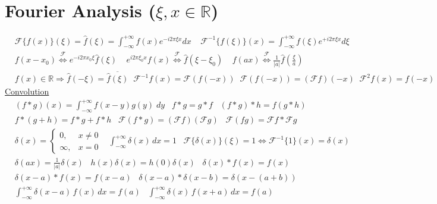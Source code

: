 \section*{\normalsize Fourier Analysis{\normalfont\scriptsize \; ($\xi, x\in \mathbb{R}$)}}
\begin{align*}
&\mathcal{F}\{f(x)\}(\xi) \!=\!\hat f(\xi) \!= \!\int_{-\infty}^{+\infty}\!f(x)e^{-i 2\pi \xi x}  dx \; \;\; \; \mathcal{F}^{-1}\{f(\xi)\}(x) = \int_{-\infty}^{+\infty}\! f(\xi)e^{+i2\pi\xi x}d\xi \\
&f(x-x_0)\stackrel{\mathcal{F}}{\Longleftrightarrow} e^{-i2\pi x_0\xi} \hat f(\xi)\; \; \;\;  e^{i2\pi\xi_0 x}f(x) \stackrel{\mathcal{F}}{\Longleftrightarrow} \hat{f}(\xi-\xi_0)\; \; \; \; f(ax) \stackrel{\mathcal{F}}{\Longleftrightarrow}\frac{1}{|a|}\hat{f}\left( \frac{\xi}{a}\right)\\
&f(x)\!\in\! \mathbb{R}\!\Rightarrow \!\hat{f}(-\xi)\!=\! \overline{\hat{f}(\xi)} \; \; \mathcal{F}^{-\!1}\!f(x) \!=\! \mathcal{F}(f(-x)\!) \;\; \mathcal{F}(f(-x)\!)\!=\!(\mathcal{F}f)(-x)\; \; \mathcal{F}^2\!f(x)\!=\!f(-x)
\end{align*}
\underline{Convolution}
\begin{align*}
    &(f*g)(x)= \int_{-\infty}^{+\infty}f(x-y)g(y)\;\!dy \; \; \; f*g = g*f \; \; \; (f*g)*h=f(g*h) \\
    &f*(g+h)=f*g+f*h \; \; \;  \mathcal{F}(f*g)=(\mathcal{F}f)(\mathcal{F}g)\; \; \;  \mathcal{F}(fg)= \mathcal{F}f*\mathcal{F}g
\end{align*}
\underline{}
\begin{align*}
&\delta(x) = \begin{cases}
0, & x \ne 0 \\
\infty, & x = 0
\end{cases}\;\;\;
\int_{-\infty}^{+\infty} \delta(x) \, dx = 1 \; \; \; \mathcal{F}\{\delta(x)\}(\xi) = 1\Leftrightarrow \mathcal{F}^{-1}\{1\}(x)=\delta(x)\\
&\delta(ax) = \frac{1}{|a|} \delta(x) \; \; \;
h(x) \delta(x) = h(0) \delta(x) \; \; \; 
\delta(x) * f(x) = f(x) \\&    \delta(x - a) * f(x) = f(x - a)\; \; \;\delta(x - a) * \delta(x - b) = \delta(x - (a + b))\\
& \int_{-\infty}^{+\infty} \delta(x - a)\, f(x)\, dx = f(a) \; \; \; 
 \int_{-\infty}^{+\infty} \delta(x)\, f(x + a)\, dx = f(a)
\end{align*}


